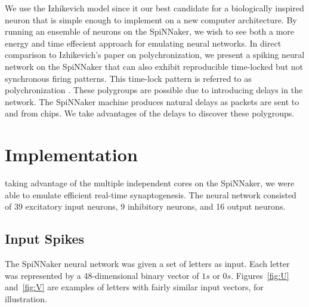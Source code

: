 \documentclass[journal]{./sty/IEEEtran}
\begin{document}
We use the Izhikevich model since it our best candidate for a biologically inspired neuron
that is simple enough to implement on a new computer architecture. 
By running an ensemble of neurons on the SpiNNaker, 
we wish to see both a more energy and time effecient approach for emulating neural networks.
In direct comparison to Izhikevich's paper on polychronization, 
we present a spiking neural network on the SpiNNaker 
that can also exhibit reproducible time-locked but not synchronous firing patterns.
This time-lock pattern is referred to as polychronization \cite{Polychron:Izhi}.
These polygroups are possible due to introducing delays in the network.
The SpiNNaker machine produces natural delays as packets are sent to and from chips.
We take advantages of the delays to discover these polygroups.


\section{Implementation}
 taking advantage of the multiple independent cores on the SpiNNaker, we were able to emulate efficient real-time synaptogenesis. The neural network consisted of 39 excitatory input neurons, 9 inhibitory neurons, and 16 output neurons. 

\subsection{Input Spikes}
The SpiNNaker neural network was given a set of letters as input. 
Each letter was represented by a 48-dimensional binary vector of $1s$ or $0s$. Figures~\ref{fig:U} and~\ref{fig:V} are examples of letters with fairly similar input vectors, for illustration.
\end{document}
